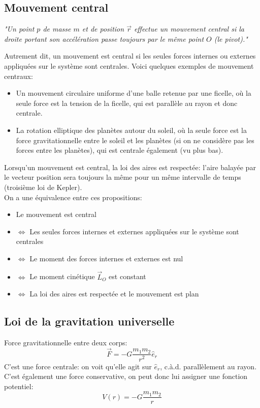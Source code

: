 \documentclass{article}
\numberwithin{equation}{section}
\begin{document}
\subsection{Mouvement central}
\begin{center}
	\emph{"Un point \(p\) de masse \(m\) et de position \(\vec r\) effectue un mouvement central si la droite portant son accélération passe toujours par le même point \(O\) (le pivot)."}
\end{center}
Autrement dit, un mouvement est central si les seules forces internes ou externes appliquées sur le système sont centrales. Voici quelques exemples de mouvement centraux:
\begin{itemize} 
	\item Un mouvement circulaire uniforme d'une balle retenue par une ficelle, où la seule force est la tension de la ficelle, qui est parallèle au rayon et donc centrale.
	\item La rotation elliptique des planètes autour du soleil, où la seule force est la force gravitationnelle entre le soleil et les planètes (si on ne considère pas les forces entre les planètes), qui est centrale également (vu plus bas). \\
\end{itemize}
Lorsqu'un mouvement est central, la loi des aires est respectée: l'aire balayée par le vecteur position sera toujours la même pour un même intervalle de temps (troisième loi de Kepler). \\

On a une équivalence entre ces propositions:
\begin{itemize}
	\item Le mouvement est central
	\item \(\Leftrightarrow\) Les seules forces internes et externes appliquées sur le système sont centrales
	\item \(\Leftrightarrow\) Le moment des forces internes et externes est nul
	\item \(\Leftrightarrow\) Le moment cinétique \(\vec L_O\) est constant
	\item \(\Leftrightarrow\) La loi des aires est respectée et le mouvement est plan
\end{itemize}

\subsection{Loi de la gravitation universelle}
Force gravitationnelle entre deux corps:
\begin{equation}
	\boxed{ \vec F = -G \dfrac{m_1m_2}{r^2} \hat e_r }
\end{equation}
C'est une force centrale: on voit qu'elle agit sur \(\hat e_r\), c.à.d. parallèlement au rayon. C'est également une force conservative, on peut donc lui assigner une fonction potentiel:
\begin{equation}
	\boxed{ V(r) = -G \dfrac{m_1m_2}{r} }
\end{equation}
\end{document}
